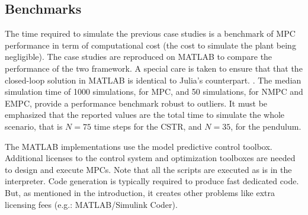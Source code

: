 \subsection{Benchmarks}
\label{sec:benchmarks}

The time required to simulate the previous case studies is a benchmark of MPC performance in term of computational cost (the cost to simulate the plant being negligible). The case studies are reproduced on MATLAB to compare the performance of the two framework. A special care is taken to ensure that that the closed-loop solution in MATLAB is identical to Julia’s counterpart. . The median simulation time of 1000 simulations, for MPC, and 50 simulations, for NMPC and EMPC, provide a performance benchmark robust to outliers. It must be emphasized that the reported values are the total time to simulate the whole scenario, that is $N=75$ time steps for the CSTR, and $N=35$, for the pendulum.

The MATLAB implementations use the model predictive control toolbox. Additional licenses to the control system and optimization toolboxes are needed to design and execute MPCs. Note that all the scripts are executed as is in the interpreter. Code generation is typically required to produce fast dedicated code. But, as mentioned in the introduction, it creates other problems like extra licensing fees (e.g.: MATLAB/Simulink Coder).

